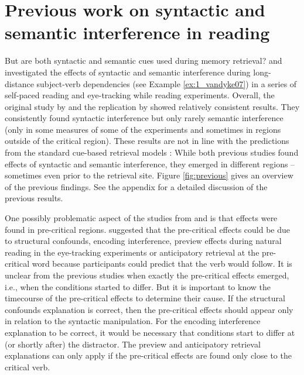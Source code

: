 \documentclass[a4paper, man, floatsintext]{apa7}
\begin{document}
\newpage
\printbibliography

\appendix 

\section{Previous work on syntactic and semantic interference in reading}

But are both syntactic and semantic cues used during memory retrieval? \citet{vandyke07} and \citet{mertzen} investigated the effects of syntactic and semantic interference during long-distance subject-verb dependencies (see Example \ref{ex:1_vandyke07}) in a series of self-paced reading and eye-tracking while reading experiments. Overall, the original study by \citet{vandyke07} and the replication by \citet{mertzen} showed relatively consistent results. They consistently found syntactic interference but only rarely semantic interference (only in some measures of some of the experiments and sometimes in regions outside of the critical region). These results are not in line with the predictions from the standard cue-based retrieval models \citep{Lewis2005, mcelree}: While both previous studies found effects of syntactic and semantic interference, they emerged in different regions -- sometimes even prior to the retrieval site. Figure \ref{fig:previous} gives an overview of the previous findings. See the appendix for a detailed discussion of the previous results.

One possibly problematic aspect of the studies from \citet{vandyke07} and \citet{mertzen} is that effects were found in pre-critical regions. \citet{mertzen} suggested that the pre-critical effects could be due to structural confounds, encoding interference, preview effects during natural reading in the eye-tracking experiments or anticipatory retrieval at the pre-critical word because participants could predict that the verb would follow. It is unclear from the previous studies when exactly the pre-critical effects emerged, i.e., when the conditions started to differ. But it is important to know the timecourse of the pre-critical effects to determine their cause. If the structural confounds explanation is correct, then the pre-critical effects should appear only in relation to the syntactic manipulation. For the encoding interference explanation to be correct, it would be necessary that conditions start to differ at (or shortly after) the distractor. The preview and anticipatory retrieval explanations can only apply if the pre-critical effects are found only close to the critical verb.
\end{document}
